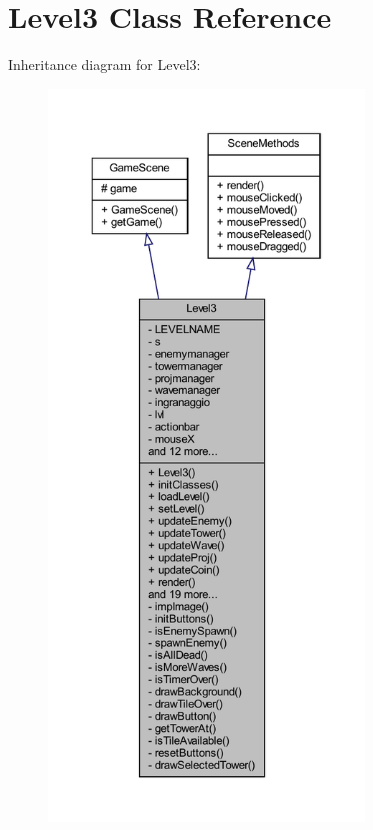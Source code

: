 \hypertarget{classscenes_1_1_level3}{}\section{Level3 Class Reference}
\label{classscenes_1_1_level3}


Inheritance diagram for Level3\+:\nopagebreak
\begin{figure}[H]
\begin{center}
\leavevmode
\includegraphics[height=550pt]{classscenes_1_1_level3__inherit__graph}
\end{center}
\end{figure}



